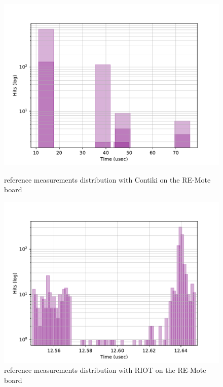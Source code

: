 \begin{figure}[!ht]
        \centering
        \includegraphics[scale=.7]{assets/reference-value-contiki-remote.pdf}
        \caption{reference measurements distribution with Contiki on the RE-Mote board\label{fig:reference-value-contiki-remote}}
        \centering
        \includegraphics[scale=.7]{assets/reference-value-riot-remote.pdf}
        \caption{reference measurements distribution with RIOT on the RE-Mote board\label{fig:reference-value-riot-remote}}
\end{figure}

